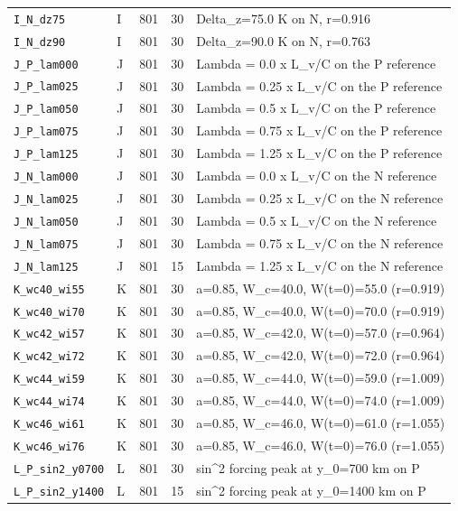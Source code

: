 {\begin{longtable}{llrrp{7.0cm}}
\texttt{I\_N\_dz75} & I & 801 & 30 & Delta\_z=75.0 K on N, r=0.916\\
\texttt{I\_N\_dz90} & I & 801 & 30 & Delta\_z=90.0 K on N, r=0.763\\
\texttt{J\_P\_lam000} & J & 801 & 30 & Lambda = 0.0 x L\_v/C on the P reference\\
\texttt{J\_P\_lam025} & J & 801 & 30 & Lambda = 0.25 x L\_v/C on the P reference\\
\texttt{J\_P\_lam050} & J & 801 & 30 & Lambda = 0.5 x L\_v/C on the P reference\\
\texttt{J\_P\_lam075} & J & 801 & 30 & Lambda = 0.75 x L\_v/C on the P reference\\
\texttt{J\_P\_lam125} & J & 801 & 30 & Lambda = 1.25 x L\_v/C on the P reference\\
\texttt{J\_N\_lam000} & J & 801 & 30 & Lambda = 0.0 x L\_v/C on the N reference\\
\texttt{J\_N\_lam025} & J & 801 & 30 & Lambda = 0.25 x L\_v/C on the N reference\\
\texttt{J\_N\_lam050} & J & 801 & 30 & Lambda = 0.5 x L\_v/C on the N reference\\
\texttt{J\_N\_lam075} & J & 801 & 30 & Lambda = 0.75 x L\_v/C on the N reference\\
\texttt{J\_N\_lam125} & J & 801 & 15 & Lambda = 1.25 x L\_v/C on the N reference\\
\texttt{K\_wc40\_wi55} & K & 801 & 30 & a=0.85, W\_c=40.0, W(t=0)=55.0 (r=0.919)\\
\texttt{K\_wc40\_wi70} & K & 801 & 30 & a=0.85, W\_c=40.0, W(t=0)=70.0 (r=0.919)\\
\texttt{K\_wc42\_wi57} & K & 801 & 30 & a=0.85, W\_c=42.0, W(t=0)=57.0 (r=0.964)\\
\texttt{K\_wc42\_wi72} & K & 801 & 30 & a=0.85, W\_c=42.0, W(t=0)=72.0 (r=0.964)\\
\texttt{K\_wc44\_wi59} & K & 801 & 30 & a=0.85, W\_c=44.0, W(t=0)=59.0 (r=1.009)\\
\texttt{K\_wc44\_wi74} & K & 801 & 30 & a=0.85, W\_c=44.0, W(t=0)=74.0 (r=1.009)\\
\texttt{K\_wc46\_wi61} & K & 801 & 30 & a=0.85, W\_c=46.0, W(t=0)=61.0 (r=1.055)\\
\texttt{K\_wc46\_wi76} & K & 801 & 30 & a=0.85, W\_c=46.0, W(t=0)=76.0 (r=1.055)\\
\texttt{L\_P\_sin2\_y0700} & L & 801 & 30 & sin\textasciicircum{}2 forcing peak at y\_0=700 km on P\\
\texttt{L\_P\_sin2\_y1400} & L & 801 & 15 & sin\textasciicircum{}2 forcing peak at y\_0=1400 km on P\\

\end{longtable}}

